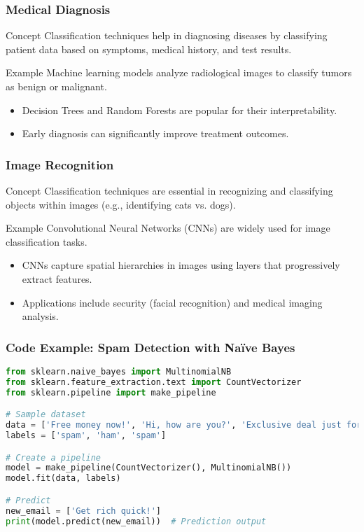 \documentclass[aspectratio=169]{beamer}
\begin{document}
\begin{frame}
    \frametitle{Medical Diagnosis}
    \begin{block}{Concept}
        Classification techniques help in diagnosing diseases by classifying patient data based on symptoms, medical history, and test results.
    \end{block}
    \begin{block}{Example}
        Machine learning models analyze radiological images to classify tumors as benign or malignant.
    \end{block}
    \begin{itemize}
        \item Decision Trees and Random Forests are popular for their interpretability.
        \item Early diagnosis can significantly improve treatment outcomes.
    \end{itemize}
\end{frame}

\begin{frame}
    \frametitle{Image Recognition}
    \begin{block}{Concept}
        Classification techniques are essential in recognizing and classifying objects within images (e.g., identifying cats vs. dogs).
    \end{block}
    \begin{block}{Example}
        Convolutional Neural Networks (CNNs) are widely used for image classification tasks.
    \end{block}
    \begin{itemize}
        \item CNNs capture spatial hierarchies in images using layers that progressively extract features.
        \item Applications include security (facial recognition) and medical imaging analysis.
    \end{itemize}
\end{frame}

\begin{frame}[fragile]
    \frametitle{Code Example: Spam Detection with Naïve Bayes}
    \begin{lstlisting}[language=Python]
from sklearn.naive_bayes import MultinomialNB
from sklearn.feature_extraction.text import CountVectorizer
from sklearn.pipeline import make_pipeline

# Sample dataset
data = ['Free money now!', 'Hi, how are you?', 'Exclusive deal just for you!']
labels = ['spam', 'ham', 'spam']

# Create a pipeline
model = make_pipeline(CountVectorizer(), MultinomialNB())
model.fit(data, labels)

# Predict
new_email = ['Get rich quick!']
print(model.predict(new_email))  # Prediction output
    \end{lstlisting}
\end{frame}
\end{document}
